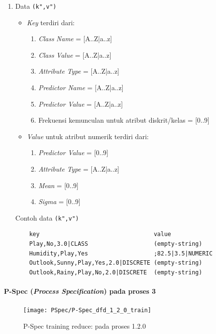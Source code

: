 \begin{enumerate}
	\item{Data \verb|(k",v")|}
	\begin{itemize}
		\item \textit{Key} terdiri dari:
		\begin{enumerate}
			\item \textit{Class Name} = [A..Z|a..z] 
			\item \textit{Class Value} = [A..Z|a..z] 
			\item \textit{Attribute Type} = [A..Z|a..z]	
			\item \textit{Predictor Name} = [A..Z|a..z]	
			\item \textit{Predictor Value} = [A..Z|a..z]
			\item Frekuensi kemunculan untuk atribut diskrit/kelas = [0..9]
		\end{enumerate}
				
		\item \textit{Value} untuk atribut numerik terdiri dari:
		\begin{enumerate}
			\item \textit{Predictor Value} = [0..9] 
			\item \textit{Attribute Type} = [A..Z|a..z] 			
			\item \textit{Mean} = [0..9]
			\item \textit{Sigma} = [0..9]
		\end{enumerate}
	\end{itemize}
	Contoh data \verb|(k",v")|
	\begin{lstlisting}
	key									value
	Play,No,3.0|CLASS					(empty-string)
	Humidity,Play,Yes 					;82.5|3.5|NUMERIC
	Outlook,Sunny,Play,Yes,2.0|DISCRETE	(empty-string)
	Outlook,Rainy,Play,No,2.0|DISCRETE	(empty-string)
	\end{lstlisting}


\end{enumerate}


\paragraph{P-Spec (\textit{Process Specification}) pada proses 3}

\begin{figure}[H]
	\centering
	\texttt{[image: PSpec/P-Spec\_dfd\_1\_2\_0\_train]}
	\caption[P-Spec training reduce: pada proses 1.2.0]{P-Spec training reduce: pada proses 1.2.0}
	\label{fig:P-Spec training reduce: pada proses 1.2.0}
\end{figure}

